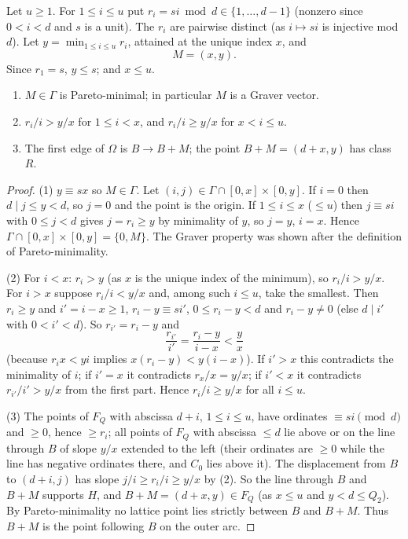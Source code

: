 Let $u\ge1$. For $1\le i\le u$ put $r_i=si\bmod d\in\{1,\dots,d-1\}$ (nonzero since $0<i<d$ and $s$ is a unit). The $r_i$ are pairwise distinct (as $i\mapsto si$ is injective mod $d$). Let $y=\min_{1\le i\le u}r_i$, attained at the unique index $x$, and
\[
  M=(x,y).
\]
Since $r_1=s$, $y\le s$; and $x\le u$.

\begin{lemma}[Records]\label{lem:records}
\begin{enumerate}
\item $M\in\Gamma$ is Pareto-minimal; in particular $M$ is a Graver vector.
\item $r_i/i>y/x$ for $1\le i<x$, and $r_i/i\ge y/x$ for $x<i\le u$.
\item The first edge of $\Omega$ is $B\to B+M$; the point $B+M=(d+x,y)$ has class $R$.
\end{enumerate}
\end{lemma}
\begin{proof}
(1) $y\equiv sx$ so $M\in\Gamma$. Let $(i,j)\in\Gamma\cap[0,x]\times[0,y]$. If $i=0$ then $d\mid j\le y<d$, so $j=0$ and the point is the origin. If $1\le i\le x$ ($\le u$) then $j\equiv si$ with $0\le j<d$ gives $j=r_i\ge y$ by minimality of $y$, so $j=y$, $i=x$. Hence $\Gamma\cap[0,x]\times[0,y]=\{0,M\}$. The Graver property was shown after the definition of Pareto-minimality.

(2) For $i<x$: $r_i>y$ (as $x$ is the unique index of the minimum), so $r_i/i>y/x$. For $i>x$ suppose $r_i/i<y/x$ and, among such $i\le u$, take the smallest. Then $r_i\ge y$ and $i'=i-x\ge1$, $r_i-y\equiv si'$, $0\le r_i-y<d$ and $r_i-y\ne0$ (else $d\mid i'$ with $0<i'<d$). So $r_{i'}=r_i-y$ and
\[
  \frac{r_{i'}}{i'}=\frac{r_i-y}{i-x}<\frac yx
\]
(because $r_ix<yi$ implies $x(r_i-y)<y(i-x)$). If $i'>x$ this contradicts the minimality of $i$; if $i'=x$ it contradicts $r_x/x=y/x$; if $i'<x$ it contradicts $r_{i'}/i'>y/x$ from the first part. Hence $r_i/i\ge y/x$ for all $i\le u$.

(3) The points of $F_Q$ with abscissa $d+i$, $1\le i\le u$, have ordinates $\equiv si\pmod d$ and $\ge0$, hence $\ge r_i$; all points of $F_Q$ with abscissa $\le d$ lie above or on the line through $B$ of slope $y/x$ extended to the left (their ordinates are $\ge0$ while the line has negative ordinates there, and $C_0$ lies above it). The displacement from $B$ to $(d+i,j)$ has slope $j/i\ge r_i/i\ge y/x$ by (2). So the line through $B$ and $B+M$ supports $H$, and $B+M=(d+x,y)\in F_Q$ (as $x\le u$ and $y<d\le Q_2$). By Pareto-minimality no lattice point lies strictly between $B$ and $B+M$. Thus $B+M$ is the point following $B$ on the outer arc.
\end{proof}

